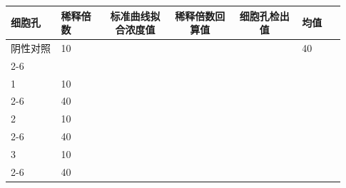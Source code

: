 \documentclass[UTF8,10pt,a4paper,fontset=fandol]{ctexart}
\newcommand{\fieldvalue}[1]{#1}
\newcommand{\handwritten}[1]{#1}
\begin{document}
\begin{tabular}{|p{0.14\linewidth}|p{0.13\linewidth}|p{0.18\linewidth}|p{0.18\linewidth}|p{0.18\linewidth}|p{0.12\linewidth}|}
\hline
细胞孔 & 稀释倍数 & \multicolumn{1}{c|}{标准曲线拟合浓度值} &
\multicolumn{1}{c|}{稀释倍数回算值} &
\multicolumn{1}{c|}{细胞孔检出值} & 均值\\
\hline
阴性对照 &
\fieldvalue{\handwritten{10}} &
& & & %
\fieldvalue{\handwritten{40}}\\
\cline{2-6}
& & & & &\\
\hline
1 &
\fieldvalue{\handwritten{10}} &
& & & \\
\cline{2-6}
&%
\fieldvalue{\handwritten{40}} & & & &\\
\hline
2 &
\fieldvalue{\handwritten{10}} &
& & & \\
\cline{2-6}
&%
\fieldvalue{\handwritten{40}} & & & &\\
\hline
3 &
\fieldvalue{\handwritten{10}} &
& & & \\
\cline{2-6}
&%
\fieldvalue{\handwritten{40}} & & & &\\
\hline
\end{tabular}


\newpage
\end{document}

